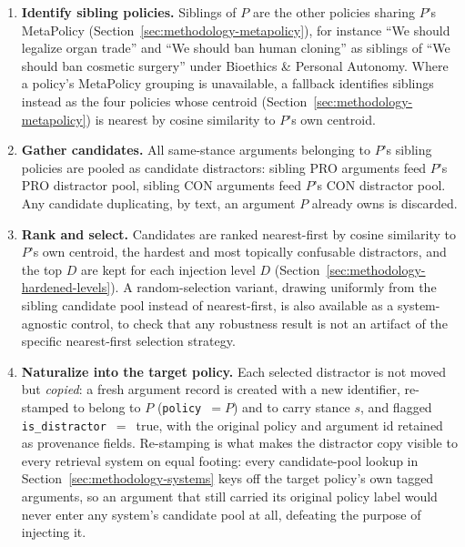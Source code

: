 \begin{enumerate}
\item \textbf{Identify sibling policies.} Siblings of $P$ are the other policies sharing $P$'s
MetaPolicy (Section~\ref{sec:methodology-metapolicy}), for instance ``We should legalize organ
trade'' and ``We should ban human cloning'' as siblings of ``We should ban cosmetic surgery''
under Bioethics \& Personal Autonomy. Where a policy's MetaPolicy grouping is unavailable, a
fallback identifies siblings instead as the four policies whose centroid
(Section~\ref{sec:methodology-metapolicy}) is nearest by cosine similarity to $P$'s own centroid.

\item \textbf{Gather candidates.} All same-stance arguments belonging to $P$'s sibling policies are
pooled as candidate distractors: sibling PRO arguments feed $P$'s PRO distractor pool, sibling CON
arguments feed $P$'s CON distractor pool. Any candidate duplicating, by text, an argument $P$
already owns is discarded.

\item \textbf{Rank and select.} Candidates are ranked nearest-first by cosine similarity to $P$'s
own centroid, the hardest and most topically confusable distractors, and the top $D$ are kept for
each injection level $D$ (Section~\ref{sec:methodology-hardened-levels}). A random-selection
variant, drawing uniformly from the sibling candidate pool instead of nearest-first, is also
available as a system-agnostic control, to check that any robustness result is not an artifact of
the specific nearest-first selection strategy.

\item \textbf{Naturalize into the target policy.} Each selected distractor is not moved but
\emph{copied}: a fresh argument record is created with a new identifier, re-stamped to belong to
$P$ (\texttt{policy}~$=P$) and to carry stance $s$, and flagged \texttt{is\_distractor}~$=$~true,
with the original policy and argument id retained as provenance fields. Re-stamping is what makes
the distractor copy visible to every retrieval system on equal footing: every candidate-pool
lookup in Section~\ref{sec:methodology-systems} keys off the target policy's own tagged arguments,
so an argument that still carried its original policy label would never enter any system's
candidate pool at all, defeating the purpose of injecting it.
\end{enumerate}

